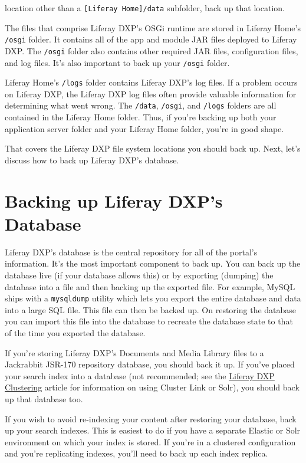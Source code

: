 \noindent\hrulefill location other than a \texttt{{[}Liferay\ Home{]}/data}
subfolder, back up that location.

The files that comprise Liferay DXP's OSGi runtime are stored in Liferay
Home's \texttt{/osgi} folder. It contains all of the app and module JAR
files deployed to Liferay DXP. The \texttt{/osgi} folder also contains
other required JAR files, configuration files, and log files. It's also
important to back up your \texttt{/osgi} folder.

Liferay Home's \texttt{/logs} folder contains Liferay DXP's log files.
If a problem occurs on Liferay DXP, the Liferay DXP log files often
provide valuable information for determining what went wrong. The
\texttt{/data}, \texttt{/osgi}, and \texttt{/logs} folders are all
contained in the Liferay Home folder. Thus, if you're backing up both
your application server folder and your Liferay Home folder, you're in
good shape.

That covers the Liferay DXP file system locations you should back up.
Next, let's discuss how to back up Liferay DXP's database.

\section{Backing up Liferay DXP's
Database}\label{backing-up-liferay-dxps-database}

Liferay DXP's database is the central repository for all of the portal's
information. It's the most important component to back up. You can back
up the database live (if your database allows this) or by exporting
(dumping) the database into a file and then backing up the exported
file. For example, MySQL ships with a \texttt{mysqldump} utility which
lets you export the entire database and data into a large SQL file. This
file can then be backed up. On restoring the database you can import
this file into the database to recreate the database state to that of
the time you exported the database.

If you're storing Liferay DXP's Documents and Media Library files to a
Jackrabbit JSR-170 repository database, you should back it up. If you've
placed your search index into a database (not recommended; see the
\href{/docs/7-0/deploy/-/knowledge_base/d/liferay-clustering}{Liferay
DXP Clustering} article for information on using Cluster Link or Solr),
you should back up that database too.

If you wish to avoid re-indexing your content after restoring your
database, back up your search indexes. This is easiest to do if you have
a separate Elastic or Solr environment on which your index is stored. If
you're in a clustered configuration and you're replicating indexes,
you'll need to back up each index replica.

